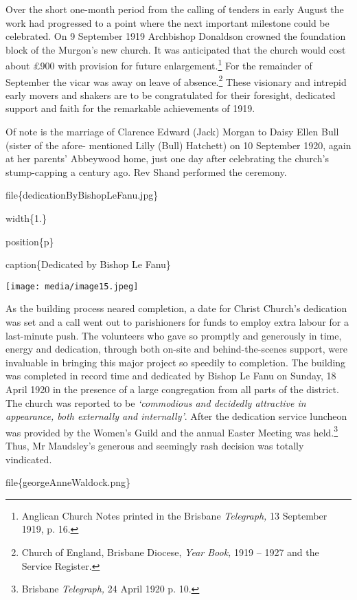 Over the short one-month period from the calling of tenders in early August the work had progressed to a point where the next important milestone could be celebrated. On 9 September 1919 Archbishop Donaldson crowned the foundation block of the Murgon's new church. It was anticipated that the church would cost about £900 with provision for future enlargement.\footnote{Anglican Church Notes printed in the Brisbane \emph{Telegraph,} 13 September 1919, p. 16.} For the remainder of September the vicar was away on leave of absence.\footnote{Church of England, Brisbane Diocese, \emph{Year Book,} 1919 -- 1927 and the Service Register.} These visionary and intrepid early movers and shakers are to be congratulated for their foresight, dedicated support and faith for the remarkable achievements of 1919.

Of note is the marriage of Clarence Edward (Jack) Morgan to Daisy Ellen Bull (sister of the afore- mentioned Lilly (Bull) Hatchett) on 10 September 1920, again at her parents' Abbeywood home, just one day after celebrating the church's stump-capping a century ago. Rev Shand performed the ceremony.

file\{dedicationByBishopLeFanu.jpg\}

width\{1.\}

position\{p\}

caption\{Dedicated by Bishop Le Fanu\}

\texttt{[image: media/image15.jpeg]}

As the building process neared completion, a date for Christ Church's dedication was set and a call went out to parishioners for funds to employ extra labour for a last-minute push. The volunteers who gave so promptly and generously in time, energy and dedication, through both on-site and behind-the-scenes support, were invaluable in bringing this major project so speedily to completion. The building was completed in record time and dedicated by Bishop Le Fanu on Sunday, 18 April 1920 in the presence of a large congregation from all parts of the district. The church was reported to be \emph{`commodious and decidedly attractive in appearance, both externally and internally'}. After the dedication service luncheon was provided by the Women's Guild and the annual Easter Meeting was held.\footnote{Brisbane \emph{Telegraph,} 24 April 1920 p. 10.} Thus, Mr Maudsley's generous and seemingly rash decision was totally vindicated.

file\{georgeAnneWaldock.png\}

